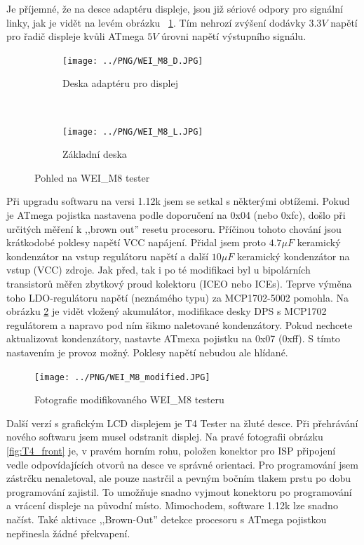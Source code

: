 Je příjemné, že na desce adaptéru displeje, jsou již sériové odpory pro signální linky, jak je vidět
na levém obrázku ~\ref{fig:WeiM8int}. Tím nehrozí zvýšení dodávky \(3.3V\) napětí pro řadič displeje kvůli
ATmega \(5V\) úrovni napětí výstupního signálu.

\begin{figure}[H]
  \begin{subfigure}[b]{.5\textwidth}
    \centering
    \texttt{[image: ../PNG/WEI\_M8\_D.JPG]}
    \caption{Deska adaptéru pro displej}
  \end{subfigure}
  ~
  \begin{subfigure}[b]{.5\textwidth}
    \centering
    \texttt{[image: ../PNG/WEI\_M8\_L.JPG]}
    \caption{Základní deska}
  \end{subfigure}
  \caption{Pohled na  WEI\_M8 tester}
  \label{fig:WeiM8int}
\end{figure}


Při upgradu softwaru na versi 1.12k jsem se setkal s některými obtížemi.
Pokud je ATmega pojistka nastavena podle doporučení na 0x04 (nebo 0xfc), došlo při určitých měření
k ,,brown out'' resetu procesoru.
Příčinou tohoto chování jsou krátkodobé poklesy napětí VCC napájení.
Přidal jsem proto  \(4.7\mu F\) keramický kondenzátor na vstup regulátoru napětí
a další \(10\mu F\) keramický kondenzátor na vstup (VCC) zdroje.
Jak před, tak i po té modifikaci byl u bipolárních transistorů měřen zbytkový proud kolektoru (ICEO nebo ICEs).
Teprve výměna toho LDO-regulátoru napětí (neznámého typu) za MCP1702-5002 pomohla.
Na obrázku \ref{fig:WeiM8mod} je vidět vložený akumulátor,
modifikace desky DPS s MCP1702 regulátorem a napravo pod ním šikmo naletované kondenzátory.
Pokud nechcete aktualizovat kondenzátory, nastavte ATmexa pojistku na 0x07 (0xff).
S tímto nastavením je provoz možný.
Poklesy napětí nebudou ale hlídané.

\begin{figure}[H]
\centering
\texttt{[image: ../PNG/WEI\_M8\_modified.JPG]}
\caption{Fotografie modifikovaného WEI\_M8 testeru}
\label{fig:WeiM8mod}
\end{figure}

Další verzí s grafickým LCD displejem je T4 Tester na žluté desce.
Při přehrávání nového softwaru jsem musel odstranit displej.
Na pravé fotografii obrázku \ref{fig:T4_front} je, v pravém horním rohu,
 položen konektor pro ISP připojení
vedle odpovídajících otvorů na desce ve správné orientaci.
Pro programování jsem zástrčku nenaletoval, ale pouze nastrčil a pevným bočním tlakem prstu po dobu
programování zajistil.
To umožňuje snadno vyjmout konektoru po programování a vrácení displeje na původní místo.
Mimochodem, software 1.12k lze snadno načíst.
Také aktivace ,,Brown-Out'' detekce procesoru s ATmega pojistkou nepřinesla žádné překvapení.

